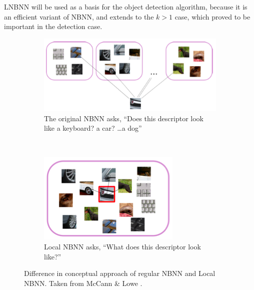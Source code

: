 LNBNN will be used as a basis for the object detection algorithm, because it is an efficient variant of NBNN, and extends to the $k>1$ case, which proved to be important in the detection case.

\begin{figure}[hbt]
    \centering
    \begin{subfigure}[b]{0.60\textwidth}
        \centering
        \includegraphics[width=\textwidth]{LNBNNa}
        \caption{The original NBNN asks, ``Does this descriptor look like a keyboard? a car? \ldots a dog''}
        \label{fig:lnbnna}
    \end{subfigure}%
    ~ %
    \begin{subfigure}[b]{0.30\textwidth}
        \centering
        \includegraphics[width=\textwidth]{LNBNNb}
        \caption{Local NBNN asks, ``What does this descriptor look like?''}
        \label{fig:lnbnnb}
    \end{subfigure}%
    \caption{Difference in conceptual approach of regular NBNN and Local NBNN. Taken from McCann \& Lowe \cite{mccann2012local}.}
    \label{fig:lnbnn}
\end{figure}



